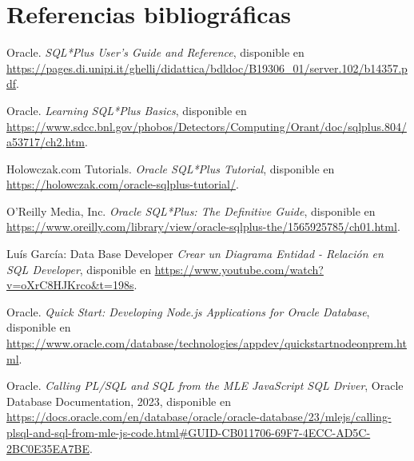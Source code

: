 \section{Referencias bibliográficas}
\begin{thebibliography}{9}
Oracle. 
\textit{SQL*Plus User’s Guide and Reference}, 
disponible en \url{https://pages.di.unipi.it/ghelli/didattica/bdldoc/B19306_01/server.102/b14357.pdf}.

Oracle. 
\textit{Learning SQL*Plus Basics}, 
disponible en \url{https://www.sdcc.bnl.gov/phobos/Detectors/Computing/Orant/doc/sqlplus.804/a53717/ch2.htm}.

Holowczak.com Tutorials. 
\textit{Oracle SQL*Plus Tutorial}, 
disponible en \url{https://holowczak.com/oracle-sqlplus-tutorial/}.

O’Reilly Media, Inc.
\textit{Oracle SQL*Plus: The Definitive Guide}, 
disponible en \url{https://www.oreilly.com/library/view/oracle-sqlplus-the/1565925785/ch01.html}.

Luís García: Data Base Developer
\textit{Crear un Diagrama Entidad - Relación en SQL Developer}, 
disponible en \url{https://www.youtube.com/watch?v=oXrC8HJKrco&t=198s}.

Oracle. 
\textit{Quick Start: Developing Node.js Applications for Oracle Database}, 
disponible en \url{https://www.oracle.com/database/technologies/appdev/quickstartnodeonprem.html}.

Oracle. 
\textit{Calling PL/SQL and SQL from the MLE JavaScript SQL Driver}, 
Oracle Database Documentation, 2023, 
disponible en \url{https://docs.oracle.com/en/database/oracle/oracle-database/23/mlejs/calling-plsql-and-sql-from-mle-js-code.html#GUID-CB011706-69F7-4ECC-AD5C-2BC0E35EA7BE}.
\end{thebibliography}
